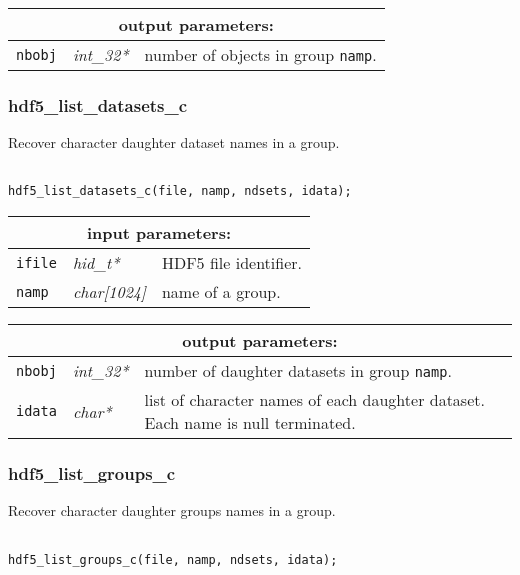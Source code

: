 \vskip 0.8cm

\noindent
\begin{tabular}{|p{1.5cm}|p{2cm}|p{11cm}|}
\hline
\multicolumn{3}{|c|}{\bf output parameters:} \\
\hline
{\tt nbobj} & {\it int\_32*} & number of objects in group {\tt namp}. \\
\hline
\end{tabular}

\subsubsection{hdf5\_list\_datasets\_c}

Recover character daughter dataset names in a group.

\begin{verbatim}

hdf5_list_datasets_c(file, namp, ndsets, idata);
\end{verbatim}

\noindent
\begin{tabular}{|p{1.5cm}|p{2cm}|p{11cm}|}
\hline
\multicolumn{3}{|c|}{\bf input parameters:} \\
\hline
{\tt ifile} & {\it hid\_t*} & HDF5 file identifier. \\
\hline
{\tt namp} & {\it char[1024]} & name of a group. \\
\hline
\end{tabular}

\vskip 0.8cm

\noindent
\begin{tabular}{|p{1.5cm}|p{2cm}|p{11cm}|}
\hline
\multicolumn{3}{|c|}{\bf output parameters:} \\
\hline
{\tt nbobj} & {\it int\_32*} & number of daughter datasets in group {\tt namp}. \\
\hline
{\tt idata} & {\it char*} & list of character names of each daughter dataset. Each name is null terminated. \\
\hline
\end{tabular}

\subsubsection{hdf5\_list\_groups\_c}

Recover character daughter groups names in a group.

\begin{verbatim}

hdf5_list_groups_c(file, namp, ndsets, idata);
\end{verbatim}

